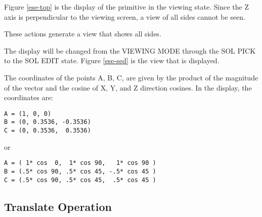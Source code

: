 
Figure \ref{ese-top} is the display of the primitive in the viewing state.
Since the
Z axis is perpendicular to the viewing screen, a view of all sides cannot be
seen.


These actions generate a view that shows all sides.


The display will be changed from the VIEWING MODE through the SOL PICK to
the SOL EDIT state.  Figure \ref{ese-sed} is the view that is displayed.

The coordinates of the points A, B, C, are given by the product of the
magnitude of the vector and the cosine of X, Y, and Z direction cosines.  In
the display, the coordinates are:

\begin{center}
\begin{verbatim}
A = (1, 0, 0)
B = (0, 0.3536, -0.3536)
C = (0, 0.3536,  0.3536)
\end{verbatim}
\end{center}
or
\begin{center}
\begin{verbatim}
A = ( 1* cos  0,  1* cos 90,   1* cos 90 )
B = (.5* cos 90, .5* cos 45, -.5* cos 45 )
C = (.5* cos 90, .5* cos 45,  .5* cos 45 )
\end{verbatim}
\end{center}

\subsection{Translate Operation}

